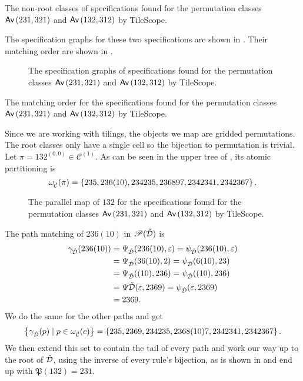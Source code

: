 \begin{table}[ht!]
    \centering
    
    \caption{The non-root classes of specifications found for the permutation classes $\textsf{Av}\left(231,321\right)$ and $\textsf{Av}\left(132,312\right)$ by TileScope.}
    \label{tab:parmapex}
\end{table}

The specification graphs for these two specifications are shown in . Their matching order are shown in .

\begin{figure}[ht!]
    \centering
    
    \caption{The specification graphs of specifications found for the permutation classes $\textsf{Av}\left(231,321\right)$ and $\textsf{Av}\left(132,312\right)$ by TileScope.}
    \label{fig:avexspecgraphs}
\end{figure}

\begin{table}[ht!]
    \centering
    
    \caption{The matching order for the specifications found for the permutation classes $\textsf{Av}\left(231,321\right)$ and $\textsf{Av}\left(132,312\right)$ by TileScope.}
    \label{tab:avexmatchingorder}
\end{table}

Since we are working with tilings, the objects we map are gridded permutations. The root classes only have a single cell so the bijection to permutation is trivial. Let $\pi=132^{(0,0)} \in \mathcal{C}^{(1)}$. As can be seen in the upper tree of , its atomic partitioning is 
\[
    \omega_{\check{\mathcal{C}}}(\pi) = \left\{235, 236(10), 234235,236897,2342341,2342367\right\}.
\]

\begin{figure}[ht!]
    \centering
    
    \caption{The parallel map of $132$ for the specifications found for the permutation classes $\textsf{Av}\left(231,321\right)$ and $\textsf{Av}\left(132,312\right)$ by TileScope.}
    \label{fig:mapexap}
\end{figure}

The path matching of $236(10)$ in $\mathscr{P}(\check{\mathcal{D}})$ is
\begin{align*}
\gamma_{\check{\mathcal{D}}}(236(10)) &= \Psi_{\check{\mathcal{D}}}(236(10),\varepsilon) = \psi_{\check{\mathcal{D}}}(236(10), \varepsilon) \\
&= \Psi_{\check{\mathcal{D}}}(36(10),2) = \psi_{\check{\mathcal{D}}}(6(10),23) \\
&= \Psi_{\check{\mathcal{D}}}((10),236) = \psi_{\check{\mathcal{D}}}((10),236) \\
&= \Psi{\check{\mathcal{D}}}(\varepsilon, 2369) = \psi_{\check{\mathcal{D}}}(\varepsilon, 2369) \\
&= 2369.
\end{align*}
We do the same for the other paths and get
\[
    \left\{\gamma_{\check{\mathcal{D}}}(p) \mid p \in \omega_{\check{\mathcal{C}}}(c)\right\} = \left\{235, 2369, 234235,2368(10)7,2342341,2342367\right\}.
\]
We then extend this set to contain the tail of every path and work our way up to the root of $\check{\mathcal{D}}$, using the inverse of every rule's bijection, as is shown in  and end up with $\mathfrak{P}(132) = 231$.

